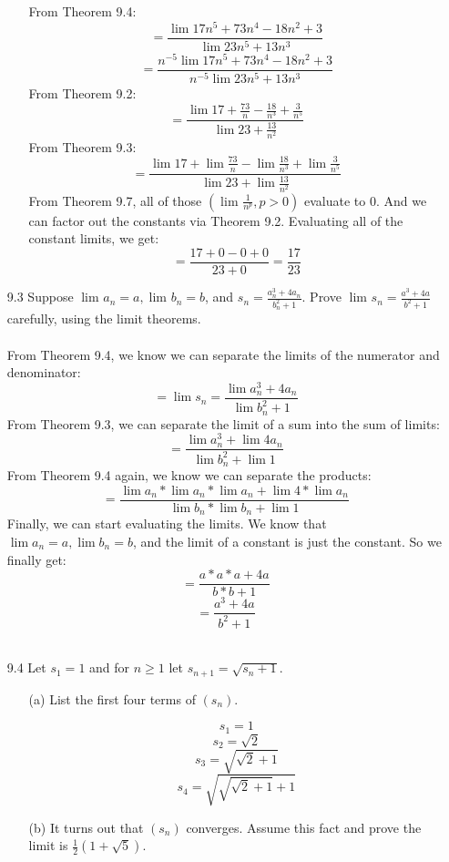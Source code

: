 \begin{itemize}
\begin{itemize}
        From Theorem 9.4:
        $$= \frac{\lim_{} 17n^5 + 73n^4 - 18n^2 + 3}{\lim_{} 23n^5 + 13n^3}$$
        $$= \frac{n^{-5} \lim_{} 17n^5 + 73n^4 - 18n^2 + 3}{n^{-5} \lim_{} 23n^5 + 13n^3}$$
        From Theorem 9.2:
        $$= \frac{\lim_{} 17 + \frac{73}{n} - \frac{18}{n^3} + \frac{3}{n^5}}{\lim_{} 23 + \frac{13}{n^2}}$$
        From Theorem 9.3:
        $$= \frac{\lim_{} 17 + \lim_{} \frac{73}{n} - \lim_{}\frac{18}{n^3} + \lim_{} \frac{3}{n^5}}{\lim_{} 23 + \lim_{} \frac{13}{n^2}}$$
        From Theorem 9.7, all of those $(\lim_{} \frac{1}{n^p}, p > 0)$ evaluate to 0. And we can factor out the constants via Theorem 9.2. Evaluating all of the constant limits, we get:
        $$= \frac{17 + 0 - 0 + 0}{23 + 0} = \frac{17}{23}$$
      
    \end{itemize}
  \item [9.3]
    Suppose $\lim_{} a_n = a, \lim_{} b_n = b$, and $s_n = \frac{a_n^3 + 4a_n}{b_n^2 + 1}$. Prove $\lim_{} s_n = \frac{a^3+4a}{b^2 + 1}$ carefully, using the limit theorems.\\\\

    From Theorem 9.4, we know we can separate the limits of the numerator and denominator:
    $$= \lim_{} s_n = \frac{\lim_{} a_n^3 + 4a_n}{\lim_{} b_n^2 + 1}$$
    From Theorem 9.3, we can separate the limit of a sum into the sum of limits:
    $$= \frac{\lim_{} a_n^3 + \lim_{} 4a_n}{\lim_{} b_n^2 + \lim_{} 1}$$
    From Theorem 9.4 again, we know we can separate the products:
    $$= \frac{\lim_{} a_n * \lim_{} a_n * \lim_{} a_n + \lim_{} 4 * \lim_{} a_n}{\lim_{} b_n * \lim_{} b_n + \lim_{} 1}$$
    Finally, we can start evaluating the limits. We know that $\lim a_n = a, \lim b_n = b$, and the limit of a constant is just the constant. So we finally get:
    $$= \frac{a * a * a + 4a}{b*b + 1}$$
    $$= \frac{a^3+4a}{b^2 + 1}$$\\

  \item [9.4]
    Let $s_1 = 1$ and for $n \geq 1$ let $s_{n+1} = \sqrt{s_n + 1}$.    
    \begin{itemize}
      \item [(a)] List the first four terms of $(s_n)$.

        $$s_1 = 1$$
        $$s_2 = \sqrt{2}$$
        $$s_3 = \sqrt{\sqrt{2} + 1}$$
        $$s_4 = \sqrt{\sqrt{\sqrt{2} + 1} + 1}$$
      \item [(b)] It turns out that $(s_n)$ converges. Assume this fact and prove the limit is $\frac{1}{2}(1 + \sqrt{5})$.\\\\


\end{itemize}
\end{itemize}
